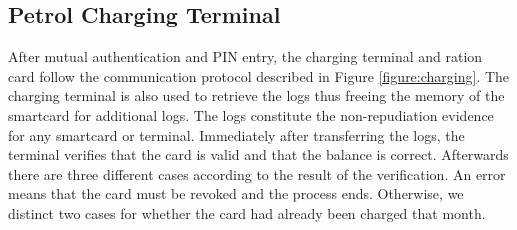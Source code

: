 \documentclass[a4paper,10pt]{llncs}
\begin{document}
\subsection{Petrol Charging Terminal}
\label{subsection:chargingterminal}
After mutual authentication and PIN entry, the charging terminal and ration card follow the communication protocol described in Figure \ref{figure:charging}. The charging terminal is also used to retrieve the logs thus freeing the memory of the smartcard for additional logs. The logs constitute the non-repudiation evidence for any smartcard or terminal. Immediately after transferring the logs, the terminal verifies that the card is valid and that the balance is correct. Afterwards there are three different cases according to the result of the verification. An error means that the card must be revoked and the process ends. Otherwise, we distinct two cases for whether the card had already been charged that month. 

\usetikzlibrary{matrix,shapes,arrows,positioning,chains, calc}
\end{document}
